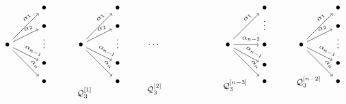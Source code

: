\documentclass{amsart}
\numberwithin{equation}{section}
\begin{document}
\[
\begin{tikzpicture}[scale=1.35]
  \draw (0,0) node (I1) {$\bullet$} +(1,1) node (J11) {$\bullet$} +(1,.5) node (J12) {$\bullet$} +(1,0.1) node (D1) { $\vdots$}+(1,-.5) node (J1N1) {$\bullet$} +(1,-1) node (J1N) {$\bullet$} ; 
  \draw[->] (I1)--(J11) node[pos=.7,above,sloped]{\scriptsize$\alpha_1$};
  \draw[->] (I1)--(J12) node[pos=.7,above,sloped]{\scriptsize$\alpha_2$};
  \draw[->] (I1)--(J1N1) node[pos=.7,above,sloped]{\scriptsize$\alpha_{n-1}$};
  \draw[->] (I1)--(J1N) node[pos=.7,above,sloped]{\scriptsize$\alpha_{n}$};

  \draw (2,0) node (I2) {$\bullet$} +(1,1) node (J21) {$\bullet$} +(1,.5) node (J22) {$\bullet$}+(1,0.1) node (D2) { $\vdots$} +(1,-.5) node (J2N1) {$\bullet$} +(1,-1) node (J2N) {$\bullet$} +(0.1,-1.3) node (P1) {\footnotesize$\mathcal Q_3^{[1]}$} ; 
  \draw[->] (I2)--(J21) node[pos=.7,above,sloped]{\scriptsize$\alpha_1$};
  \draw[->] (I2)--(J22) node[pos=.7,above,sloped]{\scriptsize$\alpha_2$};
  \draw[->] (I2)--(J2N1) node[pos=.7,above,sloped]{\scriptsize$\alpha_{n-1}$};
  \draw[->] (I2)--(J2N) node[pos=.7,above,sloped]{\scriptsize$\alpha_{n}$};

  \draw (4,0) node (DOTS) {$\dots$}+(0,-1.2) node (P2b) {\footnotesize$\mathcal Q_3^{[2]}$};

  \draw (6,0) node (I3) {$\bullet$} +(1,1) node (J31) {$\bullet$}   +(1,.6) node (D31) { $\vdots$} +(1,0) node (J3N2) {$\bullet$} +(1,-.55) node (J3N1) { $\bullet$} +(1,-1) node (J3N) {$\bullet$} +(0.2,-1.1) node (P3) {\footnotesize$\mathcal Q_3^{[n-3]}$} ; 
  \draw[->] (I3)--(J31) node[pos=.7,above,sloped]{\scriptsize$\alpha_1$};
  \draw[->] (I3)--(J3N2) node[pos=.7,above,sloped]{\scriptsize$\alpha_{n-2}$};
  \draw[->] (I3)--(J3N1) node[pos=.7,above,sloped]{\scriptsize$\alpha_{n-1}$};
  \draw[->] (I3)--(J3N) node[pos=.7,above,sloped]{\scriptsize$\alpha_{n}$};

  \draw (8,0) node (I4) {$\bullet$} +(1,1) node (J41) {$\bullet$} +(1,.5) node (J42) {$\bullet$} +(1,0.1) node (D4) { $\vdots$} +(1,-.5) node (J4N1) {$\bullet$} +(1,-1) node (J4N) {$\bullet$} +(0.2,-1) node (P4) {\footnotesize$\mathcal Q_3^{[n-2]}$}; 
  \draw[->] (I4)--(J41) node[pos=.7,above,sloped]{\scriptsize$\alpha_1$};
  \draw[->] (I4)--(J42) node[pos=.7,above,sloped]{\scriptsize$\alpha_2$};
  \draw[->] (I4)--(J4N1) node[pos=.7,above,sloped]{\scriptsize$\alpha_{n-1}$};
  \draw[->] (I4)--(J4N) node[pos=.7,above,sloped]{\scriptsize$\alpha_{n}$};


\end{tikzpicture}\]
\end{document}
